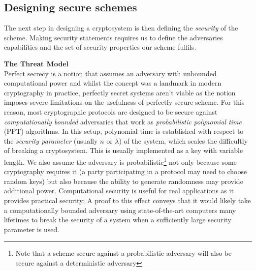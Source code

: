 \documentclass[bsc,frontabs,singlespacing,parskip,deptreport]{infthesis}
\newcommand{\chapsubhead}[1]{\vspace{0.5em}\textbf{\large #1 \vspace{0.5em}}}
\begin{document}
\subsection{Designing secure schemes}


The next step in designing a cryptosystem is then defining the \textit{security} of the scheme. Making security statements requires us to define the adversaries capabilities and the set of security properties our scheme fulfils. 


\chapsubhead{The Threat Model}\\
Perfect secrecy is a notion that assumes an adversary with unbounded computational power and whilst the concept was a landmark in modern cryptography\cite{ShannonPerf} in practice, perfectly secret systems aren't viable as the notion imposes severe limitations on the usefulness of perfectly secure scheme. For this reason, most cryptographic protocols are designed to be secure against \textit{computationally bounded} adversaries that work as \textit{probabilistic polynomial time} (PPT) algorithms. In this setup, polynomial time is established with respect to the \textit{security parameter} (usually $n$ or $\lambda$) of the system, which scales the difficultly of breaking a cryptosystem. This is usually implemented as a key with variable length. We also assume the adversary is probabilistic\footnote{Note that a scheme secure against a probabilistic adversary will also be secure against a deterministic adversary} not only because some cryptography requires it (a party participating in a protocol may need to choose random keys) but also because the ability to generate randomness may provide additional power. Computational security is useful for real applications as it provides practical security; A proof to this effect conveys that it would likely take a computationally bounded adversary using state-of-the-art computers many lifetimes to break the security of a system when a sufficiently large security parameter is used. 
\end{document}
